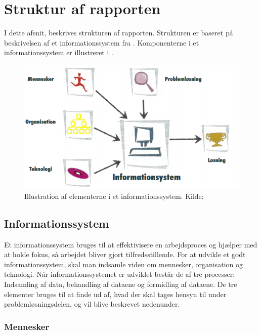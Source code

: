\chapter{Struktur af rapporten}\label{chap:struktur-af-problemanalyse}

I dette afsnit, beskrives strukturen af rapporten. Strukturen er baseret på beskrivelsen af et informationssystem fra \citet{Laudon1999}. Komponenterne i et informationssystem er illustreret i
.

\begin{figure}[htbp]
  \centering
  \includegraphics{images/kontekstmodel/metode.png}
  \caption[Metode for Kontekstmodellen]{Illustration af elementerne i et informationssystem. Kilde:
  \protect\citet{Laudon1999}}
  \label{fig:kontekstmodel}
\end{figure}


\section{Informationssystem}\label{sec:Informationssystem}

Et informationssystem bruges til at effektivisere en arbejdsproces og hjælper med at holde fokus, så arbejdet bliver gjort tilfredsstillende. 
For at udvikle et godt informationssystem, skal man indsamle viden om mennesker, organisation
og teknologi. 
Når informationssystemet er udviklet består de af tre processer: Indsamling af data, behandling af dataene
og formidling af dataene. 
De tre elementer bruges til at finde ud af, hvad der skal tages hensyn til under problemløsningsdelen, og vil blive beskrevet nedenunder.

\subsection{Mennesker}\label{subsec:mennesker}

